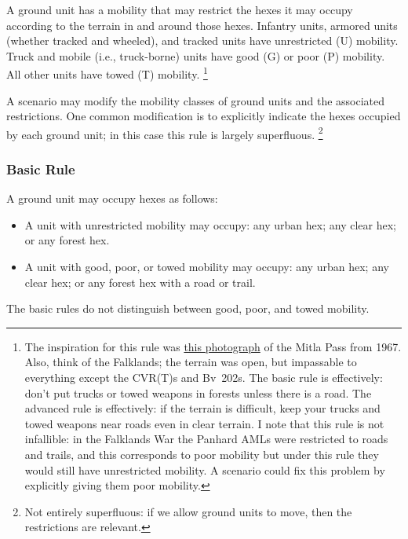 \documentclass[10pt]{article}
\newcommand{\note}[1]{%
    \footnote{%
        \setlength{\parindent}{0pt}%
        \setlength{\parskip}{\smallskipamount}%
        #1
    }%
}
\begin{document}
A ground unit has a mobility that may restrict the hexes it may occupy according to the terrain in and around those hexes.
Infantry units, armored units (whether tracked and wheeled), and tracked units have unrestricted (U) mobility. Truck and mobile (i.e., truck-borne) units have good (G) or poor (P) mobility. All other units have towed (T) mobility.%
\note{
    The inspiration for this rule was \href{https://commons.wikimedia.org/wiki/File:Aerial_view_of_the_road_through_Mitla_Pass_dotted_with_wrecked_Egyptian_vehicles_and_armour_after_Israel_air_force_attacks._June_1967._D326-013.jpg}{this photograph} of the Mitla Pass from 1967.
    Also, think of the Falklands; the terrain was open, but impassable to everything except the CVR(T)s and Bv~202s. The basic rule is effectively: don't put trucks or towed weapons in forests unless there is a road.
    The advanced rule is effectively: if the terrain is difficult, keep your trucks and towed weapons near roads even in clear terrain.
    I note that this rule is not infallible: in the Falklands War the Panhard AMLs were restricted to roads and trails, and this corresponds to poor mobility but under this rule they would still have unrestricted mobility.
    A scenario could fix this problem by explicitly giving them poor mobility.
}

A scenario may modify the mobility classes of ground units and the associated restrictions.
One common modification is to explicitly indicate the hexes occupied by each ground unit; in this case this rule is largely superfluous.%
\note{
    Not entirely superfluous: if we allow ground units to move, then the restrictions are relevant.
}

\subsubsection{Basic Rule}

A ground unit may occupy hexes as follows:
\begin{itemize}
    \item A unit with unrestricted mobility may occupy: any urban hex; any clear hex; or any forest hex.

    \item A unit with good, poor, or towed mobility may occupy: any urban hex; any clear hex; or any forest hex with a road or trail.
\end{itemize}

The basic rules do not distinguish between good, poor, and towed mobility.
\end{document}
